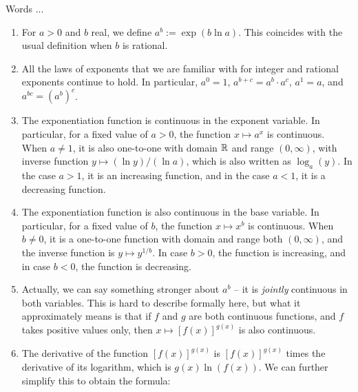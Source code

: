 \documentclass[10pt]{amsart}
\begin{document}
Words ...

\begin{enumerate}

\item For $a > 0$ and $b$ real, we define $a^b := \exp(b \ln a)$. This
  coincides with the usual definition when $b$ is rational.
\item All the laws of exponents that we are familiar with for integer
  and rational exponents continue to hold. In particular, $a^0 = 1$,
  $a^{b + c} = a^b \cdot a^c$, $a^1 = a$, and $a^{bc} = (a^b)^c$.
\item The exponentiation function is continuous in the exponent
  variable. In particular, for a fixed value of $a > 0$, the function
  $x \mapsto a^x$ is continuous. When $a \ne 1$, it is also one-to-one
  with domain $\mathbb{R}$ and range $(0,\infty)$, with inverse function $y
  \mapsto (\ln y)/(\ln a)$, which is also written as $\log_a(y)$. In
  the case $a > 1$, it is an increasing function, and in the case $a <
  1$, it is a decreasing function.
\item The exponentiation function is also continuous in the base
  variable. In particular, for a fixed value of $b$, the function $x
  \mapsto x^b$ is continuous. When $b \ne 0$, it is a one-to-one
  function with domain and range both $(0,\infty)$, and the inverse
  function is $y \mapsto y^{1/b}$. In case $b > 0$, the function is
  increasing, and in case $b < 0$, the function is decreasing.
\item Actually, we can say something stronger about $a^b$ -- it is
  {\em jointly} continuous in both variables. This is hard to describe
  formally here, but what it approximately means is that if $f$ and
  $g$ are both continuous functions, and $f$ takes positive values
  only, then $x \mapsto [f(x)]^{g(x)}$ is also continuous.
\item The derivative of the function $[f(x)]^{g(x)}$ is
  $[f(x)]^{g(x)}$ times the derivative of its logarithm, which is
  $g(x)\ln(f(x))$. We can further simplify this to obtain the formula:


\end{enumerate}
\end{document}

